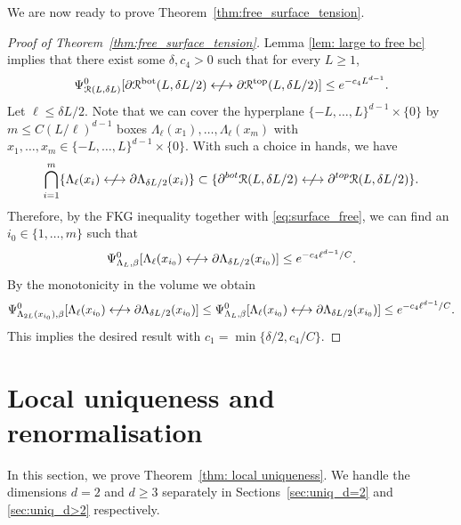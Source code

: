 \documentclass[11pt,a4paper]{article}
\theoremstyle{definition}
\numberwithin{equation}{section}
\newcommand\cR{\mathcal{R}}
\begin{document}
We are now ready to prove Theorem~\ref{thm:free_surface_tension}.

\begin{proof}[Proof of Theorem~\textup{\ref{thm:free_surface_tension}}]
Lemma \ref{lem: large to free bc} implies that there exist some $\delta,c_4>0$ such that for every $L\geq 1$,
\begin{equation}\label{eq:surface_free}
\Psi^0_{\mathcal R(L,\delta L)}[ \partial \mathcal R^{\mathrm{bot}}(L, \delta L/2) \centernot\longleftrightarrow \partial \mathcal R^{\mathrm {top}}(L, \delta L/2)] \leq e^{-c_4 L^{d-1}}.
\end{equation} Let $\ell\leq \delta L/2$. Note that we can cover the hyperplane $\{-L,\ldots,L\}^{d-1}\times \{0\}$ by $m\leq C({L}/{\ell})^{d-1}$ boxes $\Lambda_\ell(x_1),\ldots,\Lambda_\ell(x_m)$ with $x_1,\ldots,x_m\in\{-L,\ldots,L\}^{d-1}\times \{0\}$. With such a choice in hands, we have 
\begin{equation}
\bigcap_{i=1}^{m} \{\Lambda_\ell(x_i)\centernot\longleftrightarrow\partial \Lambda_{\delta L/2}(x_i)\} \subset \{\partial^{\rm bot} \cR(L, \delta L/2)\centernot\longleftrightarrow\partial^{\rm top} \cR(L, \delta L/2)\}.
\end{equation}
Therefore, by the FKG inequality together with \eqref{eq:surface_free}, we can find an $i_0\in\{1,\ldots,m\}$ such that 
\begin{equation} \label{eq: diff g}
\Psi^0_{\Lambda_{L},\beta}[\Lambda_\ell(x_{i_0})\centernot\longleftrightarrow\partial \Lambda_{\delta L/2}(x_{i_0})]\leq e^{-c_4 \ell^{d-1}/C}.
\end{equation}
By the monotonicity in the volume we obtain 
\begin{equation}
\Psi^0_{\Lambda_{2L}(x_{i_0}),\beta}[\Lambda_\ell(x_{i_0})\centernot\longleftrightarrow\partial \Lambda_{\delta L/2}(x_{i_0})]\leq \Psi^0_{\Lambda_{L},\beta}[\Lambda_\ell(x_{i_0})\centernot\longleftrightarrow\partial \Lambda_{\delta L/2}(x_{i_0})]\leq e^{-c_4 \ell^{d-1}/C}.
\end{equation}
This implies the desired result with $c_1= \min\{\delta/2, c_4/C\}$.
\end{proof}




\section{Local uniqueness and renormalisation}\label{sec:uniqueness}

In this section, we prove Theorem~\ref{thm: local uniqueness}. We handle the dimensions $d=2$ and $d\geq 3$ separately in Sections~\ref{sec:uniq_d=2} and \ref{sec:uniq_d>2} respectively. 
\end{document}
